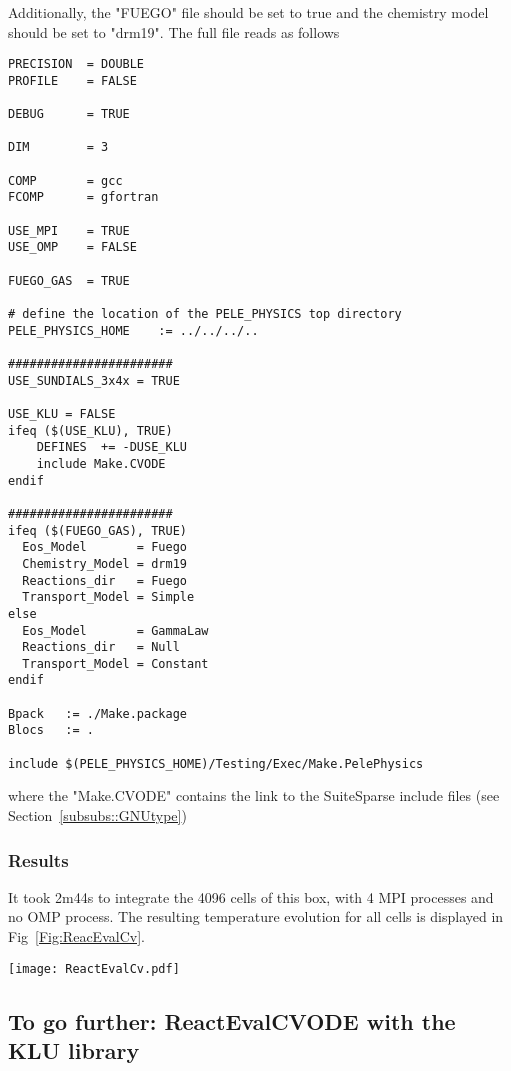 \documentclass[12pt]{article}
\begin{document}
Additionally, the "FUEGO" file should be set to true and the chemistry model should be set to "drm19". The full file reads as follows
\begin{verbatim}
PRECISION  = DOUBLE                                                                                                                   
PROFILE    = FALSE

DEBUG      = TRUE

DIM        = 3

COMP       = gcc
FCOMP      = gfortran

USE_MPI    = TRUE
USE_OMP    = FALSE

FUEGO_GAS  = TRUE

# define the location of the PELE_PHYSICS top directory
PELE_PHYSICS_HOME    := ../../../..

#######################
USE_SUNDIALS_3x4x = TRUE

USE_KLU = FALSE
ifeq ($(USE_KLU), TRUE)
    DEFINES  += -DUSE_KLU
    include Make.CVODE
endif

#######################
ifeq ($(FUEGO_GAS), TRUE)
  Eos_Model       = Fuego
  Chemistry_Model = drm19
  Reactions_dir   = Fuego
  Transport_Model = Simple
else
  Eos_Model       = GammaLaw
  Reactions_dir   = Null
  Transport_Model = Constant
endif

Bpack   := ./Make.package
Blocs   := .

include $(PELE_PHYSICS_HOME)/Testing/Exec/Make.PelePhysics         
\end{verbatim}
where the "Make.CVODE" contains the link to the SuiteSparse include files (see Section~\ref{subsubs::GNUtype})

\subsubsection{Results}
It took 2m44s to integrate the 4096 cells of this box, with 4 MPI processes and no OMP process. The resulting temperature evolution for all cells is displayed in Fig~\ref{Fig:ReacEvalCv}.

\begin{figure*}[http]
\centering
\texttt{[image: ReactEvalCv.pdf]}
\caption{Evolution of temperature in the 2x1024x2 example box, using a CV reactor and a dense direct solve, and computed with the DRM mechanism. Black: $t=0$, red: $t=1e-05s$.}
\label{Fig:ReacEvalCv}
\end{figure*}

\subsection{To go further: ReactEvalCVODE with the KLU library}
\label{subs::ReactEvalCVODEKLU}
\end{document}

